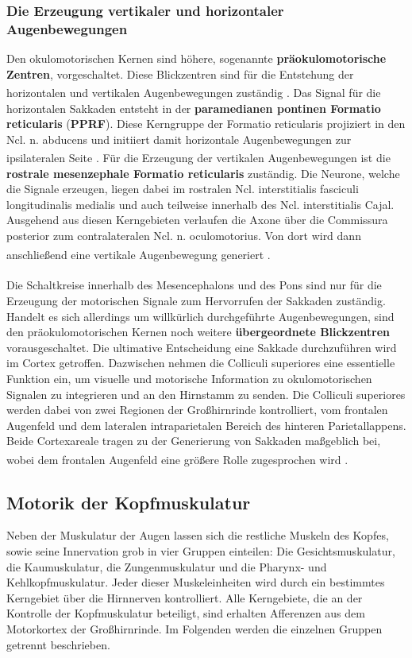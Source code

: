 \documentclass[12pt,a4paper,pdftex]{article}
\begin{document}
\subsubsection*{Die Erzeugung vertikaler und horizontaler Augenbewegungen}
Den okulomotorischen Kernen sind höhere, sogenannte \textbf{präokulomotorische Zentren}, vorgeschaltet. Diese Blickzentren sind für die Entstehung der horizontalen und vertikalen Augenbewegungen zuständig \textsuperscript{\cite[6]{trepel2011neuroanatomie}}.   
Das Signal für die horizontalen Sakkaden entsteht in der \textbf{paramedianen pontinen Formatio reticularis} (\textbf{PPRF}). Diese Kerngruppe der Formatio reticularis projiziert in den Ncl. n. abducens und initiiert damit horizontale Augenbewegungen zur ipsilateralen Seite \textsuperscript{\cite[39]{kandel2013principles}}. Für die Erzeugung der vertikalen Augenbewegungen ist die \textbf{rostrale mesenzephale Formatio reticularis} zuständig. Die Neurone, welche die Signale erzeugen, liegen dabei im rostralen Ncl. interstitialis fasciculi longitudinalis medialis und auch teilweise innerhalb des Ncl. interstitialis Cajal. Ausgehend aus diesen Kerngebieten verlaufen die Axone über die Commissura posterior zum contralateralen Ncl. n. oculomotorius. Von dort wird dann anschließend eine vertikale Augenbewegung generiert
\textsuperscript{\cite[6]{trepel2011neuroanatomie}}. \\      
\\ \noindent Die Schaltkreise innerhalb des Mesencephalons und des Pons sind nur für die Erzeugung der motorischen Signale zum Hervorrufen der Sakkaden zuständig. Handelt es sich allerdings um willkürlich durchgeführte Augenbewegungen, sind den präokulomotorischen Kernen noch weitere \textbf{übergeordnete Blickzentren} vorausgeschaltet. Die ultimative Entscheidung eine Sakkade durchzuführen wird im Cortex getroffen. Dazwischen nehmen die Colliculi superiores  eine essentielle Funktion ein, um visuelle und motorische Information zu okulomotorischen Signalen zu integrieren und an den Hirnstamm zu senden. Die Colliculi superiores werden dabei von zwei Regionen der Großhirnrinde kontrolliert, vom frontalen Augenfeld  und dem lateralen intraparietalen Bereich des hinteren Parietallappens. Beide Cortexareale tragen zu der Generierung von Sakkaden maßgeblich bei, wobei dem frontalen Augenfeld eine größere Rolle zugesprochen wird \textsuperscript{\cite[39]{kandel2013principles}}.             

\subsection{Motorik der Kopfmuskulatur} 
Neben der Muskulatur der Augen lassen sich die restliche Muskeln des Kopfes, sowie seine Innervation grob in vier Gruppen einteilen: Die Gesichtsmuskulatur, die Kaumuskulatur, die Zungenmuskulatur und die Pharynx- und Kehlkopfmuskulatur. Jeder dieser Muskeleinheiten wird durch ein bestimmtes Kerngebiet über die Hirnnerven kontrolliert. Alle Kerngebiete, die an der Kontrolle der Kopfmuskulatur beteiligt, sind erhalten Afferenzen aus dem Motorkortex der Großhirnrinde. Im Folgenden werden die einzelnen Gruppen getrennt beschrieben.
\end{document}

